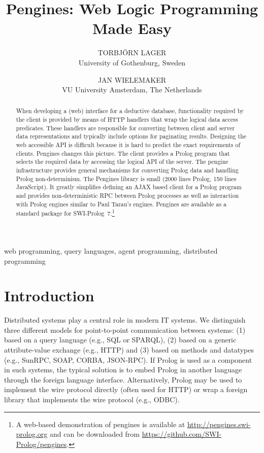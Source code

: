 \documentclass{new_tlp}
\title[Theory and Practice of Logic Programming]
        {Pengines: Web Logic Programming Made Easy}
\author[T. Lager and J. Wielemaker]
         {TORBJ\"ORN LAGER\\
	  University of Gothenburg, Sweden \\
	  \email{Torbjorn.Lager@ling.gu.se}
	  \and JAN WIELEMAKER\\
	  VU University Amsterdam, The Netherlands\\
	  \email{J.Wielemaker@vu.nl}}
\begin{document}
\label{firstpage}

\maketitle

  \begin{abstract}
When developing a (web) interface for a deductive database,
functionality required by the client is provided by means of HTTP
handlers that wrap the logical data access predicates. These handlers
are responsible for converting between client and server data
representations and typically include options for paginating results.
Designing the web accessible API is difficult because it is hard to
predict the exact requirements of clients. Pengines changes this
picture. The client provides a Prolog program that selects the required
data by accessing the logical API of the server. The pengine
infrastructure provides general mechanisms for converting Prolog data
and handling Prolog non-determinism. The Pengines library is small (2000
lines Prolog, 150 lines JavaScript). It greatly simplifies defining an
AJAX based client for a Prolog program and provides non-deterministic
RPC between Prolog processes as well as interaction with Prolog engines
similar to Paul Tarau's engines. Pengines are available as a standard
package for SWI-Prolog~7.\footnote{A web-based demonstration of pengines
is available at \url{http://pengines.swi-prolog.org} and can be
downloaded from \url{https://github.com/SWI-Prolog/pengines}.}
  \end{abstract}

  \begin{keywords}
web programming, query languages, agent programming, distributed
programming
  \end{keywords}



\section{Introduction}

Distributed systems play a central role in modern IT systems. We
distinguish three different models for point-to-point communication
between systems: (1) based on a query language (e.g., SQL or SPARQL),
(2) based on a generic attribute-value exchange (e.g., HTTP) and (3) based
on methods and datatypes (e.g., SunRPC, SOAP, CORBA, JSON-RPC). If
Prolog is used as a component in such systems, the typical solution is
to embed Prolog in another language through the foreign language
interface. Alternatively, Prolog may be used to implement the wire
protocol directly (often used for HTTP) or wrap a foreign library that
implements the wire protocol (e.g., ODBC).
\end{document}
